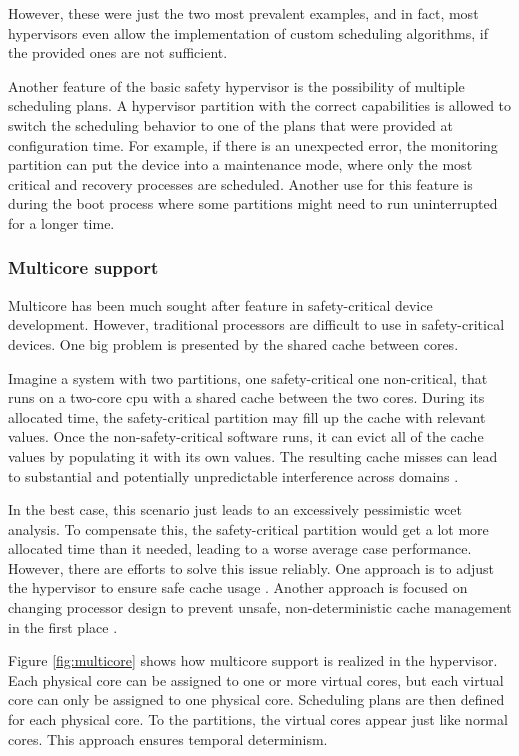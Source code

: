 However, these were just the two most prevalent examples, and in fact, most hypervisors even allow the implementation of custom scheduling algorithms, if the provided ones are not sufficient.

Another feature of the basic safety hypervisor is the possibility of multiple scheduling plans. A hypervisor partition with the correct capabilities is allowed to switch the scheduling behavior to one of the plans that were provided at configuration time. For example, if there is an unexpected error, the monitoring partition can put the device into a maintenance mode, where only the most critical and recovery processes are scheduled. Another use for this feature is during the boot process where some partitions might need to run uninterrupted for a longer time.

\subsubsection{Multicore support}
Multicore has been much sought after feature in safety-critical device development. However, traditional processors are difficult to use in safety-critical devices. 
One big problem is presented by the shared cache between cores.

Imagine a system with two partitions, one safety-critical one non-critical, that runs on a two-core \acrshort{cpu} with a shared cache between the two cores. During its allocated time, the safety-critical partition may fill up the cache with relevant values. Once the non-safety-critical software runs, it can evict all of the cache values by populating it with its own values. The resulting cache misses can lead to substantial and potentially unpredictable interference across domains \cite{biondi2018challenges}.

In the best case, this scenario just leads to an excessively pessimistic \acrfull{wcet} analysis. To compensate this, the safety-critical partition would get a lot more allocated time than it needed, leading to a worse average case performance. However, there are efforts to solve this issue reliably. One approach is to adjust the hypervisor to ensure safe cache usage \cite{modica2018supporting}. Another approach is focused on changing processor design to prevent unsafe, non-deterministic cache management in the first place \cite{el2013across}.

Figure \ref{fig:multicore} shows how multicore support is realized in the hypervisor. Each physical core can be assigned to one or more virtual cores, but each virtual core can only be assigned to one physical core. Scheduling plans are then defined for each physical core. To the partitions, the virtual cores appear just like normal cores. This approach ensures temporal determinism.

